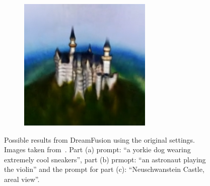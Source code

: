 \begin{figure}[ht]
\begin{subfigure}[b]{0.3\textwidth}
        \caption{}
    \end{subfigure}
    \begin{subfigure}[b]{0.3\textwidth}
        \centering
        \includegraphics[width=\textwidth]{etc/Original/dreamfusion_neuschwanstein.PNG}
        \caption{}
    \end{subfigure}
    \caption{Possible results from DreamFusion using the original settings. Images taken from~\citep{pooleDreamfusion}. Part (a) prompt: ``a yorkie dog wearing extremely cool sneakers'', part (b) prmopt: ``an astronaut playing the violin'' and the prompt for part (c): ``Neuschwanstein Castle, areal view''.}\label{fig:dreamfusionOriginal}
\end{figure}


